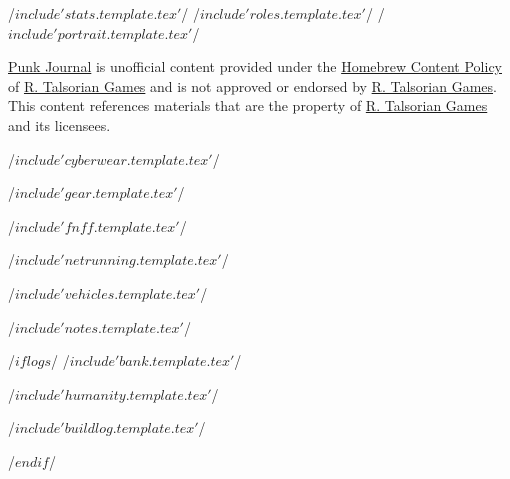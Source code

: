 \documentclass{article}[8pt]
\begin{document}
\begin{multicols*}{3}[]

/$ include 'stats.template.tex'$/
\vfill\null
\columnbreak
/$ include 'roles.template.tex' $/
\vfill\null
\columnbreak
/$ include 'portrait.template.tex' $/

\vfill\null
\small
\noindent\href{https://rpgtools.info/cyberpunk/journal}{Punk Journal} is unofficial content provided under the
\href{https://rtalsoriangames.com/homebrew-content-policy/}{Homebrew Content Policy} of
\href{https://talsorianstore.com/}{R. Talsorian Games} and is not approved or
endorsed by \href{https://talsorianstore.com/}{R. Talsorian Games}. This content references materials
that are the property of \href{https://talsorianstore.com/}{R. Talsorian Games} and its licensees.
\normalsize
\renewcommand{\baselinestretch}{1}
\end{multicols*}

\begin{multicols*}{3}
/$ include 'cyberwear.template.tex'$/
\vfill\null
\columnbreak

/$ include 'gear.template.tex'$/
\vfill\null
\columnbreak
\end{multicols*}

/$ include 'fnff.template.tex'$/

/$ include 'netrunning.template.tex'$/

/$ include 'vehicles.template.tex'$/

/$ include 'notes.template.tex'$/

/$if logs $/
/$ include 'bank.template.tex'$/

\begin{multicols*}{2}

/$ include 'humanity.template.tex'$/
\vfill\null
\columnbreak

/$ include 'buildlog.template.tex'$/
\end{multicols*}
/$endif$/
\end{document}
